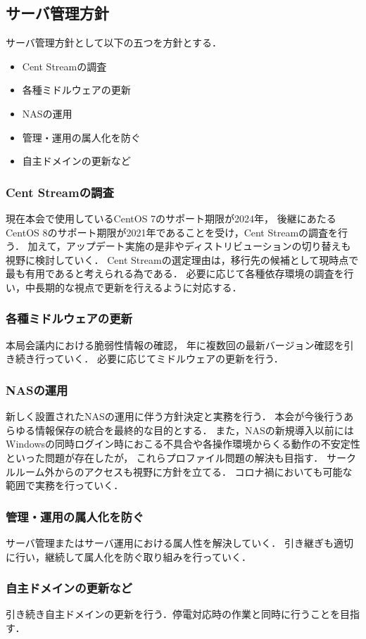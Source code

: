 \subsection*{サーバ管理方針}


サーバ管理方針として以下の五つを方針とする．
\begin{itemize}
    \item Cent Streamの調査
    \item 各種ミドルウェアの更新
    \item NASの運用
    \item 管理・運用の属人化を防ぐ
    \item 自主ドメインの更新など
\end{itemize}

\subsubsection*{Cent Streamの調査}
現在本会で使用しているCentOS 7のサポート期限が2024年，
後継にあたるCentOS 8のサポート期限が2021年であることを受け，Cent Streamの調査を行う．
加えて，アップデート実施の是非やディストリビューションの切り替えも視野に検討していく．
Cent Streamの選定理由は，移行先の候補として現時点で最も有用であると考えられる為である．
必要に応じて各種依存環境の調査を行い，中長期的な視点で更新を行えるように対応する．

\subsubsection*{各種ミドルウェアの更新}
本局会議内における脆弱性情報の確認，
年に複数回の最新バージョン確認を引き続き行っていく．
必要に応じてミドルウェアの更新を行う．

\subsubsection*{NASの運用}
新しく設置されたNASの運用に伴う方針決定と実務を行う．
本会が今後行うあらゆる情報保存の統合を最終的な目的とする．
また，NASの新規導入以前にはWindowsの同時ログイン時におこる不具合や各操作環境からくる動作の不安定性といった問題が存在したが，
これらプロファイル問題の解決も目指す．
サークルルーム外からのアクセスも視野に方針を立てる．
コロナ禍においても可能な範囲で実務を行っていく．

\subsubsection*{管理・運用の属人化を防ぐ}
サーバ管理またはサーバ運用における属人性を解決していく．
引き継ぎも適切に行い，継続して属人化を防ぐ取り組みを行っていく．

\subsubsection*{自主ドメインの更新など}
引き続き自主ドメインの更新を行う．停電対応時の作業と同時に行うことを目指す．
